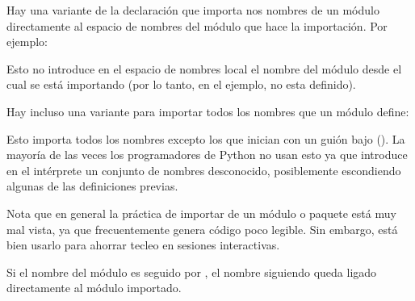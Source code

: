 \documentclass[a4,10pt,spanish]{sphinxmanual}
\begin{document}
\sphinxAtStartPar
Hay una variante de la declaración  que importa nos nombres de un módulo directamente al espacio de nombres del módulo que hace la importación. Por ejemplo:

\begin{sphinxVerbatim}[commandchars=\\\{\}]
    
\end{sphinxVerbatim}

\sphinxAtStartPar
Esto no introduce en el espacio de nombres local el nombre del módulo desde el cual se está importando (por lo tanto, en el ejemplo,  no esta definido).

\sphinxAtStartPar
Hay incluso una variante para importar todos los nombres que un módulo define:

\begin{sphinxVerbatim}[commandchars=\\\{\}]
   
\end{sphinxVerbatim}

\sphinxAtStartPar
Esto importa todos los nombres excepto los que inician con un guión bajo (\sphinxcode{\sphinxupquote{\_}}). La mayoría de las veces los programadores de Python no usan esto ya que introduce en el intérprete un conjunto de nombres desconocido, posiblemente escondiendo algunas de las definiciones previas.

\sphinxAtStartPar
Nota que en general la práctica de importar \sphinxcode{\sphinxupquote{*}} de un módulo o paquete está muy mal vista, ya que frecuentemente genera código poco legible. Sin embargo, está bien usarlo para ahorrar tecleo en sesiones interactivas.

\sphinxAtStartPar
Si el nombre del módulo es seguido por , el nombre siguiendo  queda ligado directamente al módulo importado.

\begin{sphinxVerbatim}[commandchars=\\\{\}]
   
\end{sphinxVerbatim}
\end{document}
